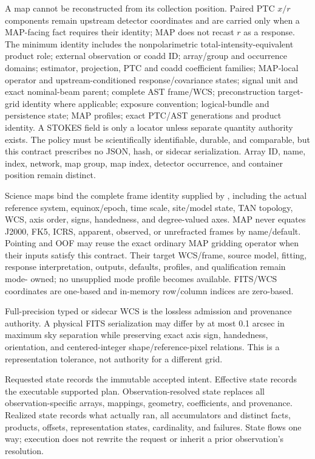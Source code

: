 \documentclass[10pt]{article}
\begin{document}
A map cannot be reconstructed from its collection position. Paired PTC
\(x/r\) components remain upstream detector coordinates and are carried only
when a MAP-facing fact requires their identity; MAP does not recast \(r\) as a
response. The minimum
identity includes the nonpolarimetric total-intensity-equivalent product role;
external observation or coadd ID; array/group and occurrence domains;
estimator, projection, PTC and coadd coefficient families; MAP-local operator
and upstream-conditioned response/covariance states; signal unit and exact
nominal-beam parent; complete AST frame/WCS; preconstruction target-grid
identity where applicable; exposure convention; logical-bundle and persistence
state; MAP profiles; exact PTC/AST generations and product identity. A STOKES
field is only a locator unless separate quantity authority exists. The policy must
be scientifically identifiable, durable, and comparable, but this contract
prescribes no JSON, hash, or sidecar serialization. Array ID, name, index,
network, map group, map index,
detector occurrence, and container position remain distinct.

Science maps bind the complete frame identity supplied by
\SCIMapASTRTCGridProfile, including the actual reference
system, equinox/epoch, time scale, site/model state, TAN topology, WCS, axis
order, signs, handedness, and degree-valued axes. MAP never equates J2000,
FK5, ICRS, apparent, observed, or unrefracted frames by name/default. Pointing
and OOF may reuse the exact ordinary MAP gridding operator when their inputs
satisfy this contract. Their target WCS/frame, source model, fitting, response
interpretation, outputs, defaults, profiles, and qualification remain mode-
owned; no unsupplied mode profile becomes available. FITS/WCS coordinates are
one-based and in-memory row/column indices are zero-based.

Full-precision typed or sidecar WCS is the lossless admission and provenance
authority. A physical FITS serialization may differ by at most 0.1 arcsec in
maximum sky separation while preserving exact axis sign, handedness,
orientation, and centered-integer shape/reference-pixel relations. This is a
representation tolerance, not authority for a different grid.

Requested state records the immutable accepted intent. Effective state records
the executable supported plan. Observation-resolved state replaces all
observation-specific arrays, mappings, geometry, coefficients, and provenance.
Realized state records what actually ran, all accumulators and distinct facts,
products, offsets, representation states, cardinality, and failures. State
flows one way; execution does not rewrite the request or inherit a prior
observation's resolution.
\end{document}
